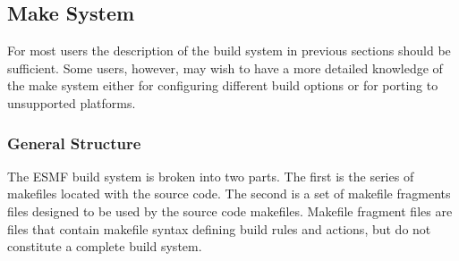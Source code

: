 

\subsection{Make System}
\label{sec:make}
For most users the description of the build system in previous
sections should be sufficient.  Some users, however, may wish to have
a more detailed knowledge of the make system either for configuring
different build options or for porting to unsupported platforms.
\subsubsection{General Structure}

The ESMF build system is broken into two parts.  The first is the
series of makefiles located with the source code.  The second is a set
of makefile fragments files designed to be used by the source code
makefiles.  Makefile fragment files are files that contain makefile
syntax defining build rules and actions, but do not constitute a
complete build system.

